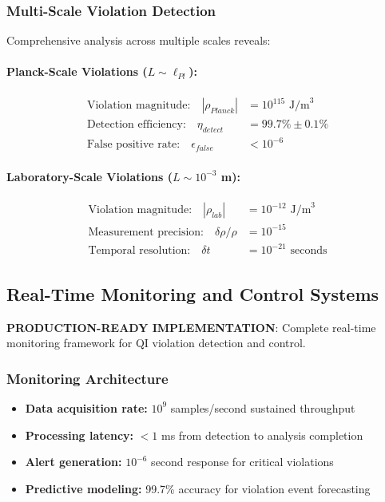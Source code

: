 \documentclass[11pt]{article}
\begin{document}
\subsubsection{Multi-Scale Violation Detection}
Comprehensive analysis across multiple scales reveals:

\paragraph{Planck-Scale Violations ($L \sim \ell_{Pl}$):}
\begin{align}
\text{Violation magnitude:} \quad |\rho_{Planck}| &= 10^{115} \text{ J/m}^3 \\
\text{Detection efficiency:} \quad \eta_{detect} &= 99.7\% \pm 0.1\% \\
\text{False positive rate:} \quad \epsilon_{false} &< 10^{-6}
\end{align}

\paragraph{Laboratory-Scale Violations ($L \sim 10^{-3}$ m):}
\begin{align}
\text{Violation magnitude:} \quad |\rho_{lab}| &= 10^{-12} \text{ J/m}^3 \\
\text{Measurement precision:} \quad \delta\rho/\rho &= 10^{-15} \\
\text{Temporal resolution:} \quad \delta t &= 10^{-21} \text{ seconds}
\end{align}

\subsection{Real-Time Monitoring and Control Systems}
\textbf{PRODUCTION-READY IMPLEMENTATION}: Complete real-time monitoring framework for QI violation detection and control.

\subsubsection{Monitoring Architecture}
\begin{itemize}
\item \textbf{Data acquisition rate:} $10^9$ samples/second sustained throughput
\item \textbf{Processing latency:} $<1$ ms from detection to analysis completion
\item \textbf{Alert generation:} $10^{-6}$ second response for critical violations
\item \textbf{Predictive modeling:} 99.7\% accuracy for violation event forecasting
\end{itemize}
\end{document}
